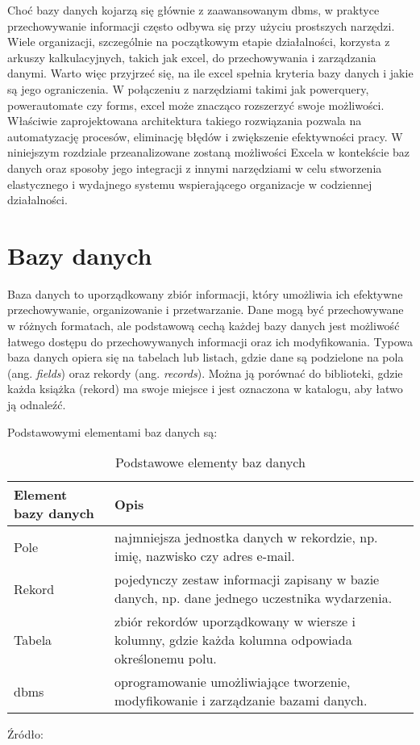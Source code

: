 Choć bazy danych kojarzą się głównie z zaawansowanym \gls{dbms}, w praktyce przechowywanie informacji często odbywa się przy użyciu prostszych narzędzi. Wiele organizacji, szczególnie na początkowym etapie działalności, korzysta z arkuszy kalkulacyjnych, takich jak \gls{excel}, do przechowywania i zarządzania danymi. Warto więc przyjrzeć się, na ile \gls{excel} spełnia kryteria bazy danych i jakie są jego ograniczenia. W połączeniu z narzędziami takimi jak \gls{powerquery}, \gls{powerautomate} czy \gls{forms}, \gls{excel} może znacząco rozszerzyć swoje możliwości. Właściwie zaprojektowana architektura takiego rozwiązania pozwala na automatyzację procesów, eliminację błędów i zwiększenie efektywności pracy. W niniejszym rozdziale przeanalizowane zostaną możliwości Excela w kontekście baz danych oraz sposoby jego integracji z innymi narzędziami w celu stworzenia elastycznego i wydajnego systemu wspierającego organizacje w codziennej działalności.

\section{Bazy danych}

Baza danych to uporządkowany zbiór informacji, który umożliwia ich efektywne przechowywanie, organizowanie i przetwarzanie. Dane mogą być przechowywane w różnych formatach, ale podstawową cechą każdej bazy danych jest możliwość łatwego dostępu do przechowywanych informacji oraz ich modyfikowania. Typowa baza danych opiera się na tabelach lub listach, gdzie dane są podzielone na pola (ang. \textit{fields}) oraz rekordy (ang. \textit{records}). \parencite[s. 3]{elmasrinavathe2016} Można ją porównać do biblioteki, gdzie każda książka (rekord) ma swoje miejsce i jest oznaczona w katalogu, aby łatwo ją odnaleźć. 

Podstawowymi elementami baz danych są:

\begin{table}[htbp]
\centering
\caption[Podstawowe elementy baz danych, źródło: \cite{elmasrinavathe2016}]{Podstawowe elementy baz danych}
\label{tab:podbazdanych}
\begin{tabular}{l p{9cm}}
\hline
\textbf{Element bazy danych} & \textbf{Opis} \\
\hline
Pole & najmniejsza jednostka danych w rekordzie, np. imię, nazwisko czy adres e-mail. \\
\hline
Rekord & pojedynczy zestaw informacji zapisany w bazie danych, np. dane jednego uczestnika wydarzenia. \\
\hline
Tabela & zbiór rekordów uporządkowany w wiersze i kolumny, gdzie każda kolumna odpowiada określonemu polu. \\
\hline
\gls{dbms} & oprogramowanie umożliwiające tworzenie, modyfikowanie i zarządzanie bazami danych. \\
\hline
\end{tabular}
\vspace{0.5em}
\par\raggedright\footnotesize{Źródło: \cite{elmasrinavathe2016}}
\end{table}


